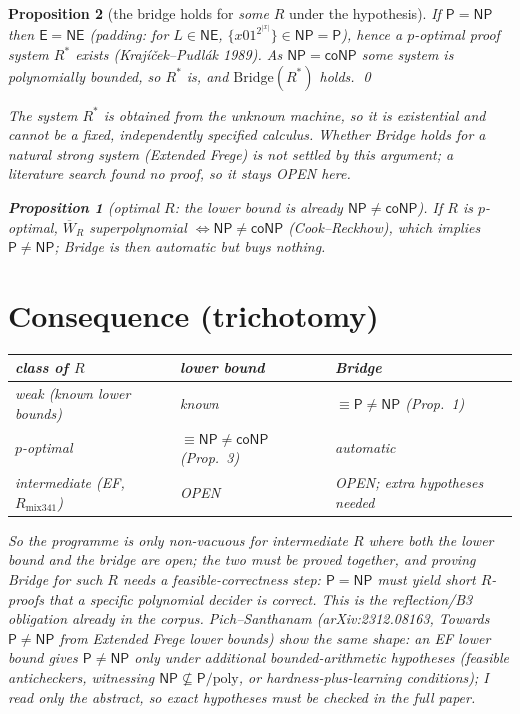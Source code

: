 \documentclass[11pt]{article}
\newtheorem{prop}{Proposition}
\begin{document}
\begin{prop}[the bridge holds for \emph{some} $R$ under the hypothesis]
If $\mathsf P=\mathsf{NP}$ then $\mathsf E=\mathsf{NE}$ (padding: for $L\in\mathsf{NE}$, $\{x01^{2^{|x|}}\}\in\mathsf{NP}=\mathsf P$), hence a $p$-optimal proof system $R^*$ exists (Kraj\'i\v cek--Pudl\'ak 1989). As $\mathsf{NP}=\mathsf{coNP}$ some system is polynomially bounded, so $R^*$ is, and $\mathrm{Bridge}(R^*)$ holds. \qed

\noindent The system $R^*$ is obtained from the unknown machine, so it is existential and cannot be a fixed, independently specified calculus. Whether Bridge holds for a \emph{natural} strong system (Extended Frege) is not settled by this argument; a literature search found no proof, so it stays OPEN here.

\begin{prop}[optimal $R$: the lower bound is already $\mathsf{NP}\ne\mathsf{coNP}$]
If $R$ is $p$-optimal, $\overline W_R$ superpolynomial $\iff\mathsf{NP}\ne\mathsf{coNP}$ (Cook--Reckhow), which implies $\mathsf P\ne\mathsf{NP}$; Bridge is then automatic but buys nothing.
\end{prop}

\section*{Consequence (trichotomy)}
\begin{center}\begin{tabular}{lll}
class of $R$ & lower bound & Bridge\\\hline
weak (known lower bounds) & known & $\equiv\mathsf P\neq\mathsf{NP}$ (Prop.~1)\\
$p$-optimal & $\equiv \mathsf{NP}\ne\mathsf{coNP}$ (Prop.~3) & automatic\\
intermediate (EF, $R_{\mathrm{mix341}}$) & OPEN & OPEN; extra hypotheses needed
\end{tabular}\end{center}
So the programme is only non-vacuous for intermediate $R$ where \emph{both} the lower bound and the bridge are open; the two must be proved together, and proving Bridge for such $R$ needs a feasible-correctness step: $\mathsf P=\mathsf{NP}$ must yield \emph{short $R$-proofs that a specific polynomial decider is correct}. This is the reflection/B3 obligation already in the corpus. Pich--Santhanam (arXiv:2312.08163, \emph{Towards $\mathsf P\neq\mathsf{NP}$ from Extended Frege lower bounds}) show the same shape: an EF lower bound gives $\mathsf P\ne\mathsf{NP}$ only under additional bounded-arithmetic hypotheses (feasible anticheckers, witnessing $\mathsf{NP}\not\subseteq\mathsf P/\mathrm{poly}$, or hardness-plus-learning conditions); I read only the abstract, so exact hypotheses must be checked in the full paper.


\end{prop}
\end{document}
